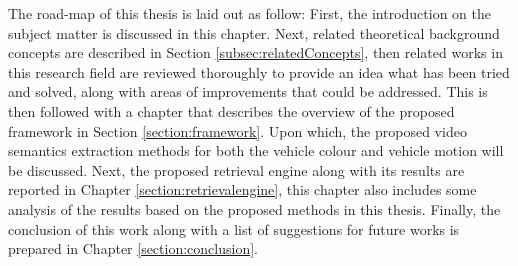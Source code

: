 The road-map of this thesis is laid out as follow: First, the introduction on the subject matter is discussed in this chapter. Next, related theoretical background concepts are described in Section \ref{subsec:relatedConcepts}, then related works in this research field are reviewed thoroughly to provide an idea what has been tried and solved, along with areas of improvements that could be addressed. This is then followed with a chapter that describes the overview of the proposed framework in Section \ref{section:framework}. Upon which, the proposed video semantics extraction methods for both the vehicle colour and vehicle motion will be discussed. Next, the proposed retrieval engine along with its results are reported in Chapter \ref{section:retrievalengine}, this chapter also includes some analysis of the results based on the proposed methods in this thesis. Finally, the conclusion of this work along with a list of suggestions for future works is prepared in Chapter \ref{section:conclusion}. 
